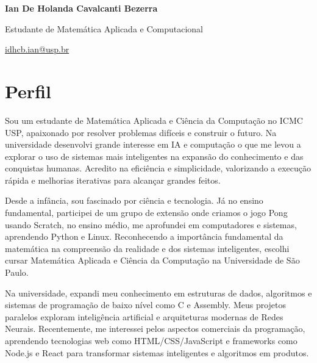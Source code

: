 \documentclass[a4paper,11pt]{article}
\begin{document}
\begin{center}
\huge\textbf{Ian De Holanda Cavalcanti Bezerra}

\large Estudante de Matemática Aplicada e Computacional

\normalsize\href{mailto:idhcb.ian@usp.br}{idhcb.ian@usp.br}
\end{center}

\section*{Perfil}
\vspace{-0.3em}
\begin{multicols}{2}
\setlength{\columnsep}{0.4cm}
\setlength{\parindent}{0pt}
\setlength{\parskip}{0.2em}
\small

Sou um estudante de Matemática Aplicada e Ciência da Computação no ICMC USP, apaixonado por resolver problemas difíceis e construir o futuro. Na universidade desenvolvi grande interesse em IA e computação o que me levou a explorar o uso de sistemas mais inteligentes na expansão do conhecimento e das conquistas humanas. Acredito na eficiência e simplicidade, valorizando a execução rápida e melhorias iterativas para alcançar grandes feitos.

Desde a infância, sou fascinado por ciência e tecnologia. Já no ensino fundamental, participei de um grupo de extensão onde criamos o jogo Pong usando Scratch, no ensino médio, me aprofundei em computadores e sistemas, aprendendo Python e Linux. Reconhecendo a importância fundamental da matemática na compreensão da realidade e dos sistemas inteligentes, escolhi cursar Matemática Aplicada e Ciência da Computação na Universidade de São Paulo.

Na universidade, expandi meu conhecimento em estruturas de dados, algoritmos e sistemas de programação de baixo nível como C e Assembly. Meus projetos paralelos exploram inteligência artificial e arquiteturas modernas de Redes Neurais. Recentemente, me interessei pelos aspectos comerciais da programação, aprendendo tecnologias web como HTML/CSS/JavaScript e frameworks como Node.js e React para transformar sistemas inteligentes e algoritmos em produtos.

\end{multicols}
\vspace{-0.3em}
\end{document}
